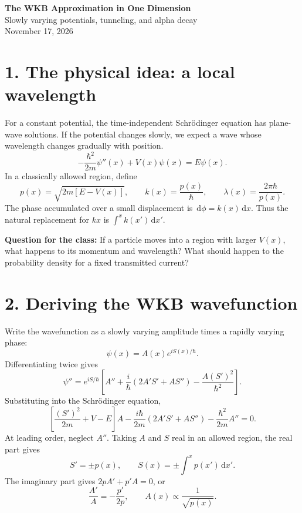 \documentclass[11pt]{article}
\newcommand{\dd}{\,\mathrm{d}}
\begin{document}
\begin{center}
{\Large\bfseries The WKB Approximation in One Dimension}\\[4pt]
{\large Slowly varying potentials, tunneling, and alpha decay}\\[3pt]
November 17, 2026
\end{center}

\section*{1. The physical idea: a local wavelength}
For a constant potential, the time-independent Schr\"odinger equation has plane-wave solutions. If the potential changes slowly, we expect a wave whose wavelength changes gradually with position.
\begin{equation}
-\frac{\hbar^2}{2m}\psi''(x)+V(x)\psi(x)=E\psi(x).
\end{equation}
In a classically allowed region, define
\begin{equation}
p(x)=\sqrt{2m[E-V(x)]},\qquad
k(x)=\frac{p(x)}{\hbar},\qquad
\lambda(x)=\frac{2\pi\hbar}{p(x)}.
\end{equation}
The phase accumulated over a small displacement is $\dd\phi=k(x)\dd x$. Thus the natural replacement for $kx$ is $\int^x k(x')\dd x'$.

\textbf{Question for the class:} If a particle moves into a region with larger $V(x)$, what happens to its momentum and wavelength? What should happen to the probability density for a fixed transmitted current?

\section*{2. Deriving the WKB wavefunction}
Write the wavefunction as a slowly varying amplitude times a rapidly varying phase:
\begin{equation}
\psi(x)=A(x)e^{iS(x)/\hbar}.
\end{equation}
Differentiating twice gives
\begin{equation}
\psi''=e^{iS/\hbar}\left[A''+\frac{i}{\hbar}(2A'S'+AS'')
-\frac{A(S')^2}{\hbar^2}\right].
\end{equation}
Substituting into the Schr\"odinger equation,
\begin{equation}
\left[\frac{(S')^2}{2m}+V-E\right]A
-\frac{i\hbar}{2m}(2A'S'+AS'')-\frac{\hbar^2}{2m}A''=0.
\end{equation}
At leading order, neglect $A''$. Taking $A$ and $S$ real in an allowed region, the real part gives
\begin{equation}
S'=\pm p(x),\qquad S(x)=\pm\int^x p(x')\dd x'.
\end{equation}
The imaginary part gives $2pA'+p'A=0$, or
\begin{equation}
\frac{A'}{A}=-\frac{p'}{2p},\qquad A(x)\propto\frac{1}{\sqrt{p(x)}}.
\end{equation}
\end{document}
